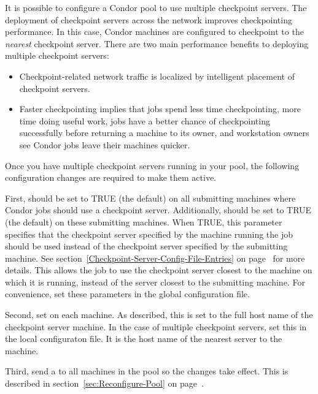 
It is possible to configure a Condor pool to use multiple checkpoint
servers.
The deployment of
checkpoint servers across the
network improves checkpointing performance.
In this case, Condor machines are configured to checkpoint to the
\emph{nearest} checkpoint server.
There are two main performance benefits to deploying multiple checkpoint
servers:
\begin{itemize}
\item Checkpoint-related network traffic is localized by
intelligent placement of checkpoint servers.
\item Faster checkpointing implies that jobs spend less time
checkpointing, more time doing useful work, jobs have a better
chance of checkpointing successfully before returning a
machine to its owner, and workstation
owners see Condor jobs leave their machines quicker.
\end{itemize}

Once you have multiple checkpoint servers running in your pool, the
following configuration changes are required to make them active.

First,  should be set to TRUE (the default) on all
submitting machines where Condor jobs should use a checkpoint server.
Additionally,  should be set to
TRUE (the default) on these submitting machines.
When TRUE, this parameter specifies that the checkpoint server
specified by the machine running the job should be used instead of the
checkpoint server specified by the submitting machine.
See section~\ref{Checkpoint-Server-Config-File-Entries} on
page~\pageref{Checkpoint-Server-Config-File-Entries} for more
details.
This allows the job to use the checkpoint server closest to the
machine on which it is running, instead of the server closest to the
submitting machine.
For convenience, set these parameters in the
global configuration file.

Second, set  on each machine.
As described, this is set to the full host name of the
checkpoint server machine.
In the case of multiple checkpoint servers, set this
in the local configuraton file.
It is
the host name of the nearest server to the machine.

Third, send a
 to all machines in the pool so the changes take
effect.
This is described in section~\ref{sec:Reconfigure-Pool} on
page~\pageref{sec:Reconfigure-Pool}.

